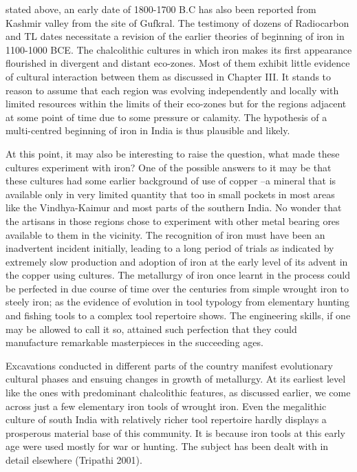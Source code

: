 stated above, an early date of 1800-1700 B.C has also been reported from Kashmir valley from the site of Gufkral. The testimony of dozens of Radiocarbon and TL dates necessitate a revision of the earlier theories of beginning of iron in 1100-1000 BCE.  The chalcolithic cultures in which iron makes its first appearance flourished in divergent and distant eco-zones. Most of them exhibit little evidence of cultural interaction between them as discussed in Chapter III. It stands to reason to assume that each region was evolving independently and locally with limited resources within the limits of their eco-zones but for the regions adjacent at some point of time due to some pressure or calamity. The hypothesis of a multi-centred beginning of iron in India is thus plausible and likely.  

At this point, it may also be interesting to raise the question, what made these cultures experiment with iron? One of the possible answers to it may be that these cultures had some earlier background of use of copper –a mineral that is available only in very limited quantity that too in small pockets in most areas like the Vindhya-Kaimur and most parts of the southern India. No wonder that the artisans in those regions chose to experiment with other metal bearing ores available to them in the vicinity. The recognition of iron must have been an inadvertent incident initially, leading to a long period of trials as indicated by extremely slow production and adoption of iron at the early level of its advent in the copper using cultures. The metallurgy of iron once learnt in the process could be perfected in due course of time over the centuries from simple wrought iron to steely iron; as the evidence of evolution in tool typology from elementary hunting and fishing tools to a complex tool repertoire shows. The engineering skills, if one may be allowed to call it so, attained such perfection that they could manufacture remarkable masterpieces in the succeeding ages. 

Excavations conducted in different parts of the country manifest evolutionary cultural phases and ensuing changes in growth of metallurgy. At its earliest level like the ones with predominant chalcolithic features, as discussed earlier, we come across just a few elementary iron tools of wrought iron. Even the megalithic culture of south India with relatively richer tool repertoire hardly displays a prosperous material base of this community. It is because iron tools at this early age were used mostly for war or hunting. The subject has been dealt with in detail elsewhere (Tripathi 2001).

